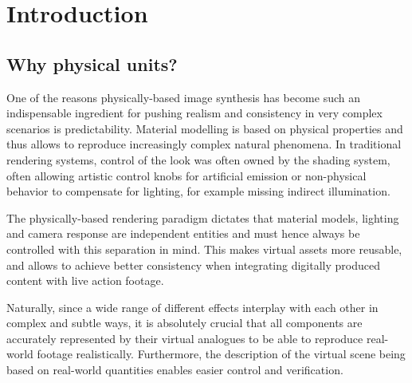 
\chapter{Introduction}

\section{Why physical units?}

One of the reasons physically-based image synthesis has become such an
indispensable ingredient for pushing realism and consistency in very
complex scenarios is predictability. Material modelling is based on
physical properties and thus allows to reproduce increasingly complex
natural phenomena. In traditional rendering systems, control of the
look was often owned by the shading system, often allowing artistic
control knobs for artificial emission or non-physical behavior to
compensate for lighting, for example missing indirect illumination.

The physically-based rendering paradigm dictates that \glspl{material model},
lighting and camera response are independent entities and
must hence always be controlled with this separation in mind. 
This makes \gls{virtual} assets more reusable, 
and allows to achieve better consistency when integrating 
digitally produced content with live action \gls{footage}.

Naturally, since a wide range of different effects interplay with each
other in complex and subtle ways, it is absolutely crucial that all
components are accurately represented by their virtual analogues to be
able to reproduce real-world footage realistically. 
Furthermore, the description of the \gls{virtual scene} being based on
real-world quantities enables easier control and verification.

